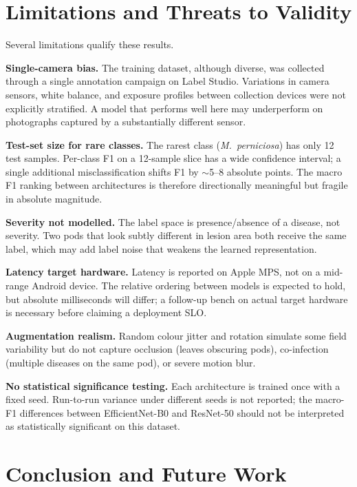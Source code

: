 \documentclass[conference,10pt]{IEEEtran}
\begin{document}
\section{Limitations and Threats to Validity}\label{sec:limits}

Several limitations qualify these results.

\textbf{Single-camera bias.} The training dataset, although diverse, was
collected through a single annotation campaign on Label Studio. Variations in
camera sensors, white balance, and exposure profiles between collection
devices were not explicitly stratified. A model that performs well here may
underperform on photographs captured by a substantially different sensor.

\textbf{Test-set size for rare classes.} The rarest class
(\textit{M.\ perniciosa}) has only 12 test samples. Per-class F1 on a
12-sample slice has a wide confidence interval; a single additional
misclassification shifts F1 by $\sim$5--8 absolute points. The macro F1
ranking between architectures is therefore directionally meaningful but
fragile in absolute magnitude.

\textbf{Severity not modelled.} The label space is presence/absence of a
disease, not severity. Two pods that look subtly different in lesion area
both receive the same label, which may add label noise that weakens the
learned representation.

\textbf{Latency target hardware.} Latency is reported on Apple MPS, not on a
mid-range Android device. The relative ordering between models is expected
to hold, but absolute milliseconds will differ; a follow-up bench on actual
target hardware is necessary before claiming a deployment SLO.

\textbf{Augmentation realism.} Random colour jitter and rotation simulate
some field variability but do not capture occlusion (leaves obscuring pods),
co-infection (multiple diseases on the same pod), or severe motion blur.

\textbf{No statistical significance testing.} Each architecture is trained
once with a fixed seed. Run-to-run variance under different seeds is not
reported; the macro-F1 differences between EfficientNet-B0 and ResNet-50
should not be interpreted as statistically significant on this dataset.

\section{Conclusion and Future Work}\label{sec:conclusion}
\end{document}
